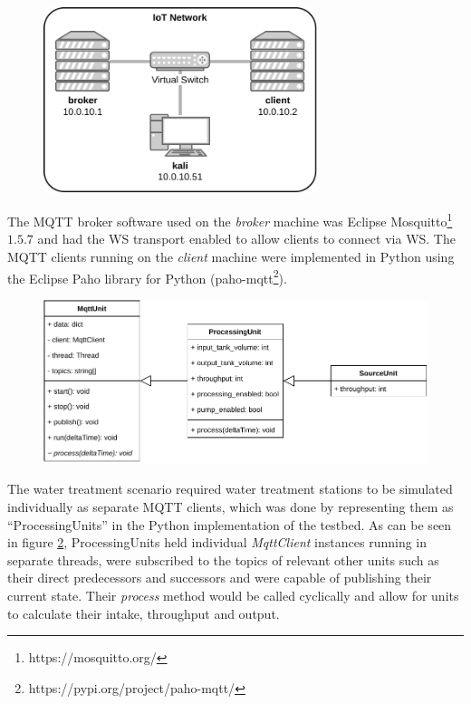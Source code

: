 \begin{figure}[h]
    \centering
    \includegraphics[width=8cm]{img/ch04/Testbed2.pdf}
    \label{fig:testbed-network}
\end{figure}
The \ac{MQTT} broker software used on the \emph{broker} machine was Eclipse Mosquitto\footnote{https://mosquitto.org/} $1.5.7$ and had the \ac{WS} transport enabled to allow clients to connect via \ac{WS}. The \ac{MQTT} clients running on the \emph{client} machine were implemented in Python using the Eclipse Paho library for Python (paho-mqtt\footnote{https://pypi.org/project/paho-mqtt/}).\par %
\begin{figure}[h]
    \centering
    \includegraphics[width=14cm]{img/ch04/Testbed-Unit.pdf}
    \label{fig:testbed-unit}
\end{figure}
The water treatment scenario required water treatment stations to be simulated individually as separate \ac{MQTT} clients, which was done by representing them as \enquote{ProcessingUnits} in the Python implementation of the testbed. As can be seen in figure \ref{fig:testbed-unit}, ProcessingUnits held individual \emph{MqttClient} instances running in separate threads, were subscribed to the topics of relevant other units such as their direct predecessors and successors and were capable of publishing their current state. Their \emph{process} method would be called cyclically and allow for units to calculate their intake, throughput and output.

